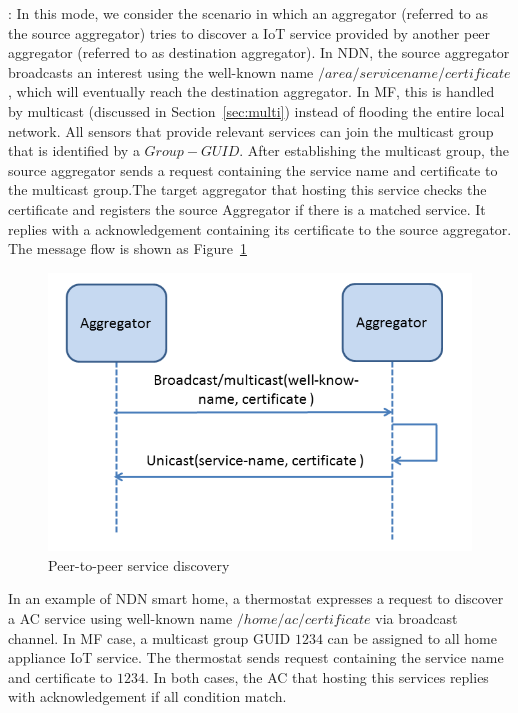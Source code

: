 \vspace{1mm}: In this mode, we consider the scenario in which an aggregator (referred to as the source aggregator) tries to discover a IoT service provided by another peer aggregator (referred to as destination aggregator). In NDN, the source aggregator broadcasts an interest using the well-known name $/area/servicename/certificate$, which will eventually reach the destination aggregator. In MF, this is handled by multicast (discussed in Section~\ref{sec:multi}) instead of flooding the entire local network. All sensors that provide relevant services can join the multicast group that is identified by a $Group-GUID$. After establishing the multicast group, the source aggregator sends a request containing the service name and certificate to the multicast group.The target aggregator that hosting this service checks the certificate and registers the source Aggregator if there is a matched service. It replies with a acknowledgement containing its certificate to the source aggregator. The message flow is shown as Figure~\ref{fig:ser_dis}
\begin{figure}
\includegraphics[width=\columnwidth]{figure/service_discovery.png}
\caption{\label{fig:ser_dis}Peer-to-peer service discovery}
\end{figure}
In an example of NDN smart home, a thermostat expresses a request to discover a AC service using well-known name $/home/ac/certificate$ via broadcast channel. In MF case, a multicast group GUID $1234$ can be assigned to all home appliance IoT service. The thermostat sends request containing the service name and certificate to $1234$. In both cases, the AC that hosting this services replies with acknowledgement if all condition match.

